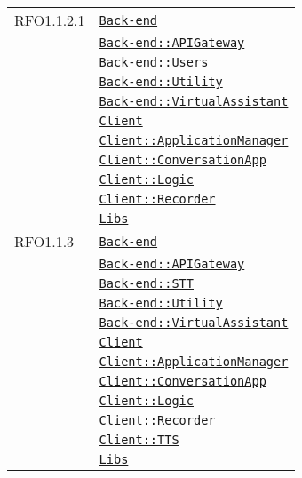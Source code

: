\begin{longtable}{|>{\centering}m{3cm}|m{10cm}<{\centering}|}
RFO1.1.2.1 & \hyperref[Back-end]{\texttt{Back-end}}\\
& \hyperref[Back-end::APIGateway]{\texttt{Back-end::APIGateway}}\\
& \hyperref[Back-end::Users]{\texttt{Back-end::Users}}\\
& \hyperref[Back-end::Utility]{\texttt{Back-end::Utility}}\\
& \hyperref[Back-end::VirtualAssistant]{\texttt{Back-end::VirtualAssistant}}\\
& \hyperref[Client]{\texttt{Client}}\\
& \hyperref[Client::ApplicationManager]{\texttt{Client::ApplicationManager}}\\
& \hyperref[Client::ConversationApp]{\texttt{Client::ConversationApp}}\\
& \hyperref[Client::Logic]{\texttt{Client::Logic}}\\
& \hyperref[Client::Recorder]{\texttt{Client::Recorder}}\\
& \hyperref[Libs]{\texttt{Libs}}\\ \hline

RFO1.1.3 & \hyperref[Back-end]{\texttt{Back-end}}\\
& \hyperref[Back-end::APIGateway]{\texttt{Back-end::APIGateway}}\\
& \hyperref[Back-end::STT]{\texttt{Back-end::STT}}\\
& \hyperref[Back-end::Utility]{\texttt{Back-end::Utility}}\\
& \hyperref[Back-end::VirtualAssistant]{\texttt{Back-end::VirtualAssistant}}\\
& \hyperref[Client]{\texttt{Client}}\\
& \hyperref[Client::ApplicationManager]{\texttt{Client::ApplicationManager}}\\
& \hyperref[Client::ConversationApp]{\texttt{Client::ConversationApp}}\\
& \hyperref[Client::Logic]{\texttt{Client::Logic}}\\
& \hyperref[Client::Recorder]{\texttt{Client::Recorder}}\\
& \hyperref[Client::TTS]{\texttt{Client::TTS}}\\
& \hyperref[Libs]{\texttt{Libs}}\\ \hline


\end{longtable}
